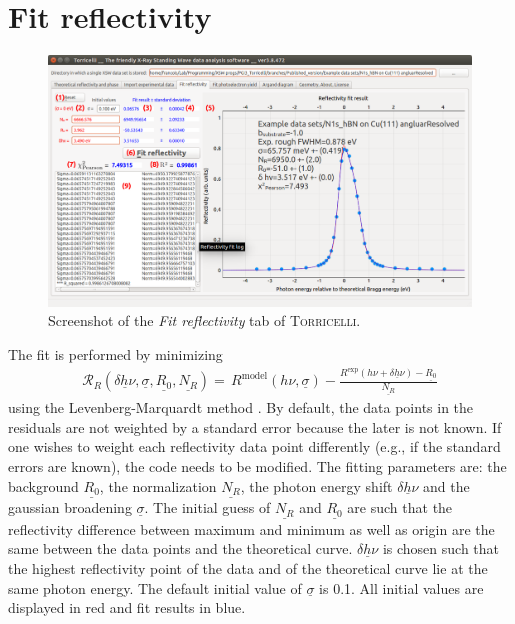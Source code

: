 \documentclass[oldfontcommands,openany,oneside]{memoir}
\begin{document}
\chapter{Fit reflectivity} \label{chap:FitRefl}
\begin{figure}[!b]
  \centering
  \includegraphics[width=1.2\textwidth]{img/Screenshot_FitRefl.pdf}
  \caption{Screenshot of the \emph{Fit reflectivity} tab of \textsc{Torricelli}.}
  \label{fig:refl}
\end{figure}

The fit is performed by minimizing
\begin{align} \label{eq:Refl}
  \mathcal{R}_R(\underline{\delta h\nu}, \underline{\sigma}, \underline{R_0}, \underline{N_R})  = \, R^\mathrm{model}\left(h\nu, \underline{\sigma}\right) - \frac{R^\mathrm{exp}(h\nu + \underline{\delta h\nu})-\underline{R_0}}{\underline{N_R}}
\end{align}
using the Levenberg-Marquardt method \cite{Levenberg1944,Marquardt1963,lmfit}. By default, the data points in the residuals are not weighted by a standard error because the later is not known. If one wishes to weight each reflectivity data point differently (e.g., if the standard errors are known), the code needs to be modified. The fitting parameters are: the background $\underline{R_0}$, the normalization $\underline{N_R}$, the photon energy shift $\underline{\delta h \nu}$ and the gaussian broadening $\underline{\sigma}$. The initial guess of $\underline{N_R}$ and $\underline{R_0}$ are such that the reflectivity difference between maximum and minimum as well as origin are the same between the data points and the theoretical curve. $\underline{\delta h \nu}$ is chosen such that the highest reflectivity point of the data and of the theoretical curve lie at the same photon energy. The default initial value of $\underline{\sigma}$ is 0.1. All initial values are displayed in red and fit results in blue.
\end{document}
